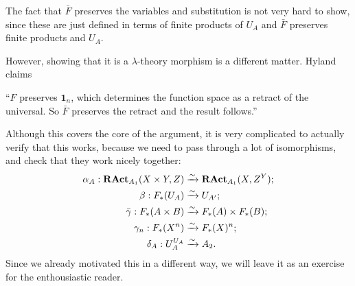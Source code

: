 \begin{remark}
  The fact that $ \bar F $ preserves the variables and substitution is not very hard to show, since these are just defined in terms of finite products of $ U_A $ and $ \bar F $ preserves finite products and $ U_A $.

  However, showing that it is a $ \lambda $-theory morphism is a different matter. Hyland claims

  \enquote{$ F $ preserves $ \mathbf 1_n $, which determines the function space as a retract of the universal. So $ \bar F $ preserves the retract and the result follows.}

  Although this covers the core of the argument, it is very complicated to actually verify that this works, because we need to pass through a lot of isomorphisms, and check that they work nicely together:
  \begin{align*}
    \alpha_A: \mathbf{RAct}_{A_1}(X \times Y, Z) &\xrightarrow{\sim} \mathbf{RAct}_{A_1}(X, Z^Y);\\
    \beta: F_*(U_A) &\xrightarrow{\sim} U_{A^\prime};\\
    \bar \gamma: F_*(A \times B) &\xrightarrow{\sim} F_*(A) \times F_*(B);\\
    \gamma_n: F_*(X^n) &\xrightarrow{\sim} F_*(X)^n;\\
    \delta_A: U_A^{U_A} &\xrightarrow{\sim} A_2.
  \end{align*}
  Since we already motivated this in a different way, we will leave it as an exercise for the enthousiastic reader.

\end{remark}
